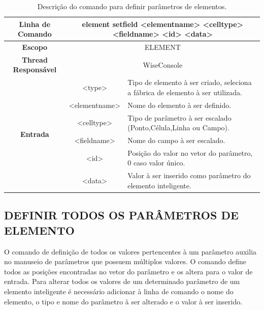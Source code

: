 \documentclass[a4paper,12pt]{monografia}
\theoremstyle{plain}
\theoremstyle{definition}
\theoremstyle{remark}
\begin{document}
\begin{center}
	\begin{table}[!htbp]
		\begin{tabular}{|c|c|m{}|}
			\hline
			\textbf{Linha de Comando} & \multicolumn{2}{c|}{element set\underline{\space\space}field <element\underline{\space\space}name> <cell\underline{\space\space}type> <field\underline{\space\space}name> <id> <data>} \\
			\hline
			\textbf{Escopo} & \multicolumn{2}{c|}{ELEMENT} \\
			\hline
			\textbf{Thread Responsável} & \multicolumn{2}{c|}{WiseConsole} \\
			\hline
			\multirow{6}{*}{\textbf{Entrada}} & <type> & Tipo de elemento à ser criado, seleciona a fábrica de elemento à ser utilizada. \\
			
			& <element\underline{\space\space}name> & Nome do elemento à ser definido. \\
			& <cell\underline{\space\space}type> & Tipo de parâmetro à ser escalado (Ponto,Célula,Linha ou Campo). \\
			& <field\underline{\space\space}name> & Nome do campo à ser escalado. \\
			& <id> & Posição do valor no vetor do parâmetro, 0 caso valor único. \\
			& <data> & Valor à ser inserido como parâmetro do elemento inteligente. \\
			\hline
		\end{tabular}
		\caption{Descrição do comando para definir parâmetros de elementos.}
		\label{tab:set_field_element}
	\end{table}
\end{center}

\subsection{DEFINIR TODOS OS PARÂMETROS DE ELEMENTO}\label{sec:set_all_field_element}

O comando de definição de todos os valores pertencentes à um parâmetro auxilia no manuseio de parâmetros que possuem múltiplos valores. O comando define todos as posições encontradas no vetor do parâmetro e os altera para o valor de entrada. Para alterar todos os valores de um determinado parâmetro de um elemento inteligente é necessário adicionar à linha de comando o nome do elemento, o tipo e nome do parâmetro à ser alterado e o valor à ser inserido.
\end{document}
